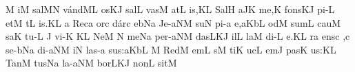 \custos M
\lineaproxima
{}i{}\punctum M\egn
\spatium
\sgn sal\pes MN\egn
\sgn v{\'a}{nd}\clivis ML\egn
\sgn {}os\clivis KJ\egn
\spatium
\sgn sal\punctum L\egn
\sgn vas\punctum M\egn
\spatium
{}at\punctum L\egn
\sgn {}i{s,}\punctum K\augmentum L\egn
\spatium
\divisiominor
\spatium
\sgn Sal\punctum H\egn
{}a{}\pes JK\egn
\spatium
\sgn me,\punctum K\egn
\spatium
\sgn fo{ns}\clivis KJ\egn
\spatium
\sgn pi-\punctum L\egn
\sgn {}et\punctum M\egn
{}t\punctum L\egn
\sgn {}i{s.}\punctum K\augmentum L\egn
\spatium
\divisiofinalis
\spatium
\custos a
\Internote
\lineaproxima
\sgn Rec\punctum a\egn
\sgn {}or\punctum c\egn
\sgn d{\'a}r\punctum c\egn
\sgn {}e{}\porrectus bNa\egn
\spatium
\sgn Je-\climacus aNM\egn
\sgn su{}\punctum N\egn
\spatium
\sgn pi-\punctum a\egn
\sgn {}e,\clivis aK\augmentumduplex bL\egn
\spatium
\divisiominor
\spatium
{}od\punctum M\egn
\spatium
\sgn sum\punctum L\egn
\spatium
\sgn cau\punctum M\egn
\sgn sa{}\punctum K\egn
\spatium
\sgn tu-\punctum L\egn
\sgn {}{\ae}{}\punctum J\egn
\spatium
\sgn vi-\punctum K\egn
\sgn {}{\ae}{:}\punctum K\augmentum L\egn
\spatium
\divisiominor
\spatium
\sgn Ne{}\punctum M\egn
\spatium
\custos N
\lineaproxima
\sgn me{}\pes Na\egn
\spatium
\sgn pe{r-}\climacus aNM\egn
\sgn das\climacus LKJ\egn
\spatium
\sgn {}il\punctum L\egn
\sgn la{}\punctum M\egn
\spatium
\sgn di-\punctum L\egn
\sgn {}e{.}\punctum K\augmentum L\egn
\spatium
\divisiofinalis
\spatium
{}r\punctum a\egn
\sgn {}e{ns}\punctum c\egn
\spatium
{},\punctum c\egn
\spatium
\sgn se-\porrectus bNa\egn
\sgn di-\climacus aNM\egn
{}i{}\punctum N\egn
\spatium
\sgn la{s-}\punctum a\egn
\sgn su{s:}\clivis aK\augmentumduplex bL\egn
\spatium
\divisiominor
\spatium
\custos M
\lineaproxima
\sgn Red\punctum M\egn
\sgn {}em\punctum L\egn
\sgn {}{\'\i}s\punctum M\egn
\sgn ti{}\punctum K\egn
\spatium
{}uc\punctum L\egn
\sgn {}em\punctum J\egn
\spatium
\sgn pas\punctum K\egn
{}u{s:}\punctum K\augmentum L\egn
\spatium
\divisiominor
\spatium
\sgn Tan\punctum M\egn
\sgn tus\pes Na\egn
\spatium
\sgn la-\climacus aNM\egn
\sgn bor\climacus LKJ\egn
\spatium
\sgn non\punctum L\egn
\spatium
\sgn sit\punctum M\egn
